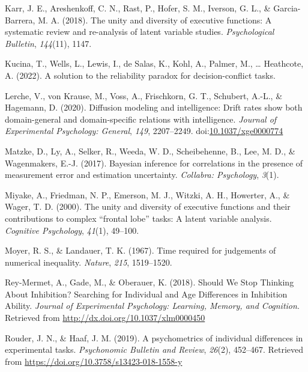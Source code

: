 \documentclass[
  ,man]{apa6}
\newlength{\cslhangindent}
\newlength{\cslentryspacingunit} %
\newenvironment{CSLReferences}[2] %
 {%
  \setlength{\parindent}{0pt}
  \ifodd #1
  \let\oldpar\par
  \def\par{\hangindent=\cslhangindent\oldpar}
  \fi
  \setlength{\parskip}{#2\cslentryspacingunit}
 }%
 {}
\begin{document}
\begin{CSLReferences}{1}{0}
\leavevmode{}%
Karr, J. E., Areshenkoff, C. N., Rast, P., Hofer, S. M., Iverson, G. L., \& Garcia-Barrera, M. A. (2018). The unity and diversity of executive functions: {A} systematic review and re-analysis of latent variable studies. \emph{Psychological Bulletin}, \emph{144}(11), 1147.

\leavevmode{}%
Kucina, T., Wells, L., Lewis, I., de Salas, K., Kohl, A., Palmer, M., \ldots{} Heathcote, A. (2022). A solution to the reliability paradox for decision-conflict tasks.

\leavevmode{}%
Lerche, V., von Krause, M., Voss, A., Frischkorn, G. T., Schubert, A.-L., \& Hagemann, D. (2020). Diffusion modeling and intelligence: {Drift} rates show both domain-general and domain-specific relations with intelligence. \emph{Journal of Experimental Psychology: General}, \emph{149}, 2207--2249. doi:\href{https://doi.org/10.1037/xge0000774}{10.1037/xge0000774}

\leavevmode{}%
Matzke, D., Ly, A., Selker, R., Weeda, W. D., Scheibehenne, B., Lee, M. D., \& Wagenmakers, E.-J. (2017). Bayesian inference for correlations in the presence of measurement error and estimation uncertainty. \emph{Collabra: Psychology}, \emph{3}(1).

\leavevmode{}%
Miyake, A., Friedman, N. P., Emerson, M. J., Witzki, A. H., Howerter, A., \& Wager, T. D. (2000). The unity and diversity of executive functions and their contributions to complex {``frontal lobe''} tasks: {A} latent variable analysis. \emph{Cognitive Psychology}, \emph{41}(1), 49--100.

\leavevmode{}%
Moyer, R. S., \& Landauer, T. K. (1967). Time required for judgements of numerical inequality. \emph{Nature}, \emph{215}, 1519--1520.

\leavevmode{}%
Rey-Mermet, A., Gade, M., \& Oberauer, K. (2018). Should {We Stop Thinking About Inhibition}? {Searching} for {Individual} and {Age Differences} in {Inhibition Ability}. \emph{Journal of Experimental Psychology: Learning, Memory, and Cognition}. Retrieved from \url{http://dx.doi.org/10.1037/xlm0000450}

\leavevmode{}%
Rouder, J. N., \& Haaf, J. M. (2019). A psychometrics of individual differences in experimental tasks. \emph{Psychonomic Bulletin and Review}, \emph{26}(2), 452--467. Retrieved from \url{https://doi.org/10.3758/s13423-018-1558-y}


\end{CSLReferences}
\end{document}
